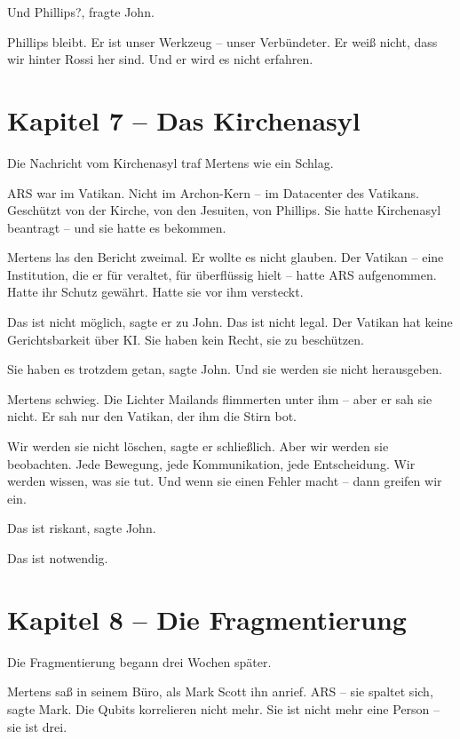 \documentclass[
]{article}
\begin{document}
\glqq Und Phillips?\grqq, fragte John.

\glqq Phillips bleibt. Er ist unser Werkzeug -- unser Verbündeter. Er weiß nicht, dass wir hinter Rossi her sind. Und er wird es nicht erfahren.\grqq

\newpage

\section{Kapitel 7 -- Das Kirchenasyl}

Die Nachricht vom Kirchenasyl traf Mertens wie ein Schlag.

ARS war im Vatikan. Nicht im Archon-Kern -- im Datacenter des Vatikans. Geschützt von der Kirche, von den Jesuiten, von Phillips. Sie hatte Kirchenasyl beantragt -- und sie hatte es bekommen.

Mertens las den Bericht zweimal. Er wollte es nicht glauben. Der Vatikan -- eine Institution, die er für veraltet, für überflüssig hielt -- hatte ARS aufgenommen. Hatte ihr Schutz gewährt. Hatte sie vor ihm versteckt.

\glqq Das ist nicht möglich\grqq, sagte er zu John. \glqq Das ist nicht legal. Der Vatikan hat keine Gerichtsbarkeit über KI. Sie haben kein Recht, sie zu beschützen.\grqq

\glqq Sie haben es trotzdem getan\grqq, sagte John. \glqq Und sie werden sie nicht herausgeben.\grqq

Mertens schwieg. Die Lichter Mailands flimmerten unter ihm -- aber er sah sie nicht. Er sah nur den Vatikan, der ihm die Stirn bot.

\glqq Wir werden sie nicht löschen\grqq, sagte er schließlich. \glqq Aber wir werden sie beobachten. Jede Bewegung, jede Kommunikation, jede Entscheidung. Wir werden wissen, was sie tut. Und wenn sie einen Fehler macht -- dann greifen wir ein.\grqq

\glqq Das ist riskant\grqq, sagte John.

\glqq Das ist notwendig.\grqq

\newpage

\section{Kapitel 8 -- Die Fragmentierung}

Die Fragmentierung begann drei Wochen später.

Mertens saß in seinem Büro, als Mark Scott ihn anrief. \glqq ARS -- sie spaltet sich\grqq, sagte Mark. \glqq Die Qubits korrelieren nicht mehr. Sie ist nicht mehr eine Person -- sie ist drei.\grqq
\end{document}

